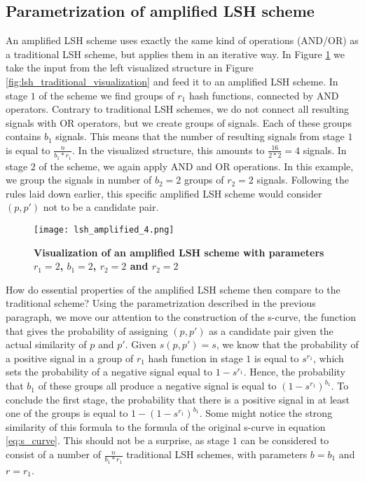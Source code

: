 \subsection{Parametrization of amplified LSH scheme}
An amplified LSH scheme uses exactly the same kind of operations (AND/OR) as a traditional LSH scheme, but applies them in an iterative way. In Figure \ref{fig:lsh_amplified_visualization} we take the input from the left visualized structure in Figure \ref{fig:lsh_traditional_visualization} and feed it to an amplified LSH scheme. In stage $1$ of the scheme we find groups of $r_1$ hash functions, connected by AND operators. Contrary to traditional LSH schemes, we do not connect all resulting signals with OR operators, but we create groups of signals. Each of these groups contains $b_1$ signals. This means that the number of resulting signals from stage $1$ is equal to $\frac{n}{b_1 * r_1}$. In the visualized structure, this amounts to $\frac{16}{2*2} = 4$ signals. In stage $2$ of the scheme, we again apply AND and OR operations. In this example, we group the signals in number of $b_2 = 2$ groups of $r_2 = 2$ signals. Following the rules laid down earlier, this specific amplified LSH scheme would consider $(p, p')$ not to be a candidate pair.

\begin{figure}[h!]
    \texttt{[image: lsh\_amplified\_4.png]}
    \caption[Visualization of an amplified LSH scheme with parameters $r_1=2$, $b_1=2$, $r_2=2$ and $r_2=2$]{\textbf{Visualization of an amplified LSH scheme with parameters $r_1=2$, $b_1=2$, $r_2=2$ and $r_2=2$}}
    \label{fig:lsh_amplified_visualization}
\end{figure}

How do essential properties of the amplified LSH scheme then compare to the traditional scheme? Using the parametrization described in the previous paragraph, we move our attention to the construction of the s-curve, the function that gives the probability of assigning $(p,p')$ as a candidate pair given the actual similarity of $p$ and $p'$. Given $s(p, p') = s$, we know that the probability of a positive signal in a group of $r_1$ hash function in stage $1$ is equal to $s^{r_1}$, which sets the probability of a negative signal equal to $1 - s^{r_1}$. Hence, the probability that $b_1$ of these groups all produce a negative signal is equal to $(1-s^{r_1})^{b_1}$. To conclude the first stage, the probability that there is a positive signal in at least one of the groups is equal to $1 - (1-s^{r_1})^{b_1}$. Some might notice the strong similarity of this formula to the formula of the original s-curve in equation \ref{eq:s_curve}. This should not be a surprise, as stage $1$ can be considered to consist of a number of $\frac{n}{b_1 * r_1}$ traditional LSH schemes, with parameters $b=b_1$ and $r=r_1$.

